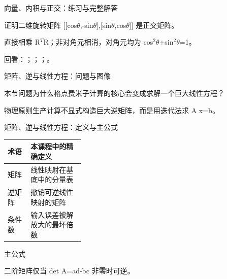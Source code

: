 \begin{frame}[t]{向量、内积与正交：练习与完整解答}
\footnotesize
\begin{block}{}证明二维旋转矩阵 [[cos\ensuremath{\theta},-sin\ensuremath{\theta}],[sin\ensuremath{\theta},cos\ensuremath{\theta}]] 是正交矩阵。\end{block}
\begin{exampleblock}{}直接相乘 R\ensuremath{^{T}}R；非对角元相消，对角元均为 cos\ensuremath{^{2}}\ensuremath{\theta}+sin\ensuremath{^{2}}\ensuremath{\theta}=1。\end{exampleblock}
\vfill
\scriptsize 回看：；；；。
\end{frame}

\begin{frame}[t]{矩阵、逆与线性方程：问题与图像}
\footnotesize
\begin{block}{本节问题}为什么格点费米子计算的核心会变成求解一个巨大线性方程？\end{block}
\begin{block}{物理原则}\quad 生产计算不显式构造巨大逆矩阵，而是用迭代法求 A x=b。\end{block}
\end{frame}

\begin{frame}[t]{矩阵、逆与线性方程：定义与主公式}
\footnotesize\begin{tabularx}{\linewidth}{p{0.30\linewidth}Y}
\toprule 术语 & 本课程中的精确定义\\\midrule
{} 矩阵 & 线性映射在基底中的分量表\\
 逆矩阵 & 撤销可逆线性映射的矩阵\\
 条件数 & 输入误差被解放大的最坏倍数\\
\bottomrule\end{tabularx}\vspace{0.15cm}
\begin{block}{ 主公式}\centering{}\end{block}
二阶矩阵仅当 det A=ad-bc 非零时可逆。
\end{frame}

